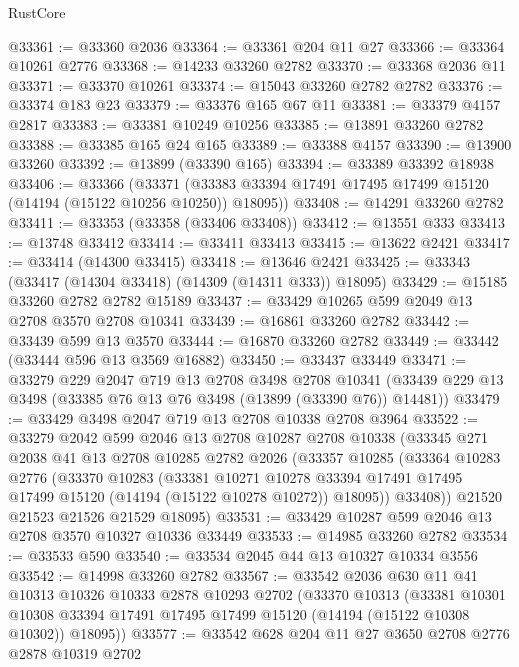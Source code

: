 \begin{lexlean}{RustCore}
\begin{coremodule}
@33361 := @33360 @2036
@33364 := @33361 @204 @11 @27
@33366 := @33364 @10261 @2776
@33368 := @14233 @33260 @2782
@33370 := @33368 @2036 @11
@33371 := @33370 @10261
@33374 := @15043 @33260 @2782 @2782
@33376 := @33374 @183 @23
@33379 := @33376 @165 @67 @11
@33381 := @33379 @4157 @2817
@33383 := @33381 @10249 @10256
@33385 := @13891 @33260 @2782
@33388 := @33385 @165 @24 @165
@33389 := @33388 @4157
@33390 := @13900 @33260
@33392 := @13899 (@33390 @165)
@33394 := @33389 @33392 @18938
@33406 := @33366
    (@33371 (@33383 @33394 @17491 @17495 @17499 @15120 (@14194 (@15122 @10256 @10250)) @18095))
@33408 := @14291 @33260 @2782
@33411 := @33353 (@33358 (@33406 @33408))
@33412 := @13551 @333
@33413 := @13748 @33412
@33414 := @33411 @33413
@33415 := @13622 @2421
@33417 := @33414 (@14300 @33415)
@33418 := @13646 @2421
@33425 := @33343 (@33417 (@14304 @33418) (@14309 (@14311 @333)) @18095)
@33429 := @15185 @33260 @2782 @2782 @15189
@33437 := @33429 @10265 @599 @2049 @13 @2708 @3570 @2708 @10341
@33439 := @16861 @33260 @2782
@33442 := @33439 @599 @13 @3570
@33444 := @16870 @33260 @2782
@33449 := @33442 (@33444 @596 @13 @3569 @16882)
@33450 := @33437 @33449
@33471 := @33279
    @229
    @2047
    @719
    @13
    @2708
    @3498
    @2708
    @10341
    (@33439 @229 @13 @3498 (@33385 @76 @13 @76 @3498 (@13899 (@33390 @76)) @14481))
@33479 := @33429 @3498 @2047 @719 @13 @2708 @10338 @2708 @3964
@33522 := @33279
    @2042
    @599
    @2046
    @13
    @2708
    @10287
    @2708
    @10338
    (@33345
      @271
      @2038
      @41
      @13
      @2708
      @10285
      @2782
      @2026
      (@33357
        @10285
        (@33364
          @10283
          @2776
          (@33370
            @10283
            (@33381
              @10271
              @10278
              @33394
              @17491
              @17495
              @17499
              @15120
              (@14194 (@15122 @10278 @10272))
              @18095))
          @33408))
      @21520
      @21523
      @21526
      @21529
      @18095)
@33531 := @33429 @10287 @599 @2046 @13 @2708 @3570 @10327 @10336 @33449
@33533 := @14985 @33260 @2782
@33534 := @33533 @590
@33540 := @33534 @2045 @44 @13 @10327 @10334 @3556
@33542 := @14998 @33260 @2782
@33567 := @33542
    @2036
    @630
    @11
    @41
    @10313
    @10326
    @10333
    @2878
    @10293
    @2702
    (@33370
      @10313
      (@33381
        @10301
        @10308
        @33394
        @17491
        @17495
        @17499
        @15120
        (@14194 (@15122 @10308 @10302))
        @18095))
@33577 := @33542 @628 @204 @11 @27 @3650 @2708 @2776 @2878 @10319 @2702

\end{coremodule}
\end{lexlean}
